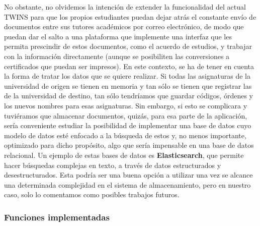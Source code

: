 No obstante, no olvidemos la intención de extender la funcionalidad del actual TWINS para que los propios estudiantes puedan dejar atrás el constante envío de documentos entre sus tutores académicos por correo electrónico, de modo que puedan dar el salto a una plataforma que implemente una interfaz que les permita prescindir de estos documentos, como el acuerdo de estudios, y trabajar con la información directamente (aunque se posibiliten las conversiones a certificados que puedan ser impresos). En este contexto, se ha de tener en cuenta la forma de tratar los datos que se quiere realizar. Si todas las asignaturas de la universidad de origen se tienen en memoria y tan sólo se tienen que registrar las de la universidad de destino, tan sólo tendríamos que guardar códigos, órdenes y los nuevos nombres para esas asignaturas. Sin embargo, si esto se complicara y tuviéramos que almacenar documentos, quizás, para esa parte de la aplicación, sería conveniente estudiar la posibilidad de implementar una base de datos cuyo modelo de datos esté enfocado a la búsqueda de estos y, no menos importante, optimizado para dicho propósito, algo que sería impensable en una base de datos relacional. Un ejemplo de estas bases de datos es \textbf{Elasticsearch}, que permite hacer búsquedas complejas en texto, a través de datos estructurados y desestructurados. Esta podría ser una buena opción a utilizar una vez se alcance una determinada complejidad en el sistema de almacenamiento, pero en nuestro caso, solo lo comentamos como posibles trabajos futuros.

\subsubsection{Funciones implementadas}

